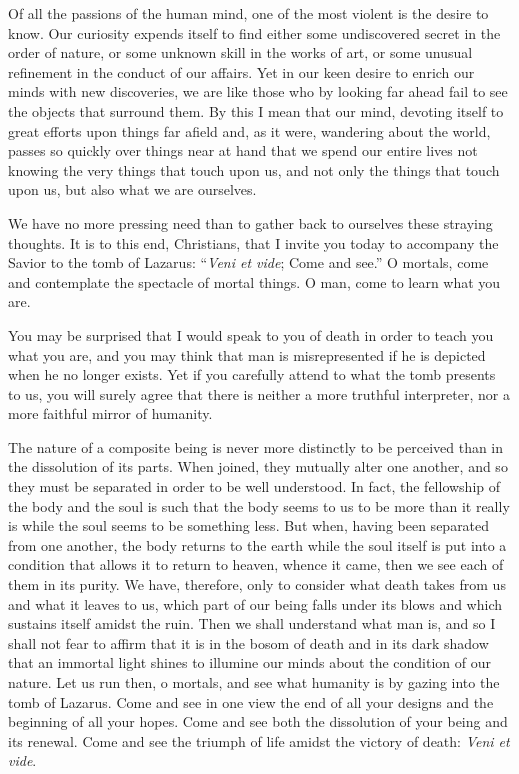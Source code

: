 \documentclass[10pt, twoside]{article}
\begin{document}
Of all the passions of the human mind, one of the most violent is the desire to know. Our curiosity expends itself to find either some undiscovered secret in the order of nature, or some unknown skill in the works of art, or some unusual refinement in the conduct of our affairs. Yet in our keen desire to enrich our minds with new discoveries, we are like those who by looking far ahead fail to see the objects that surround them. By this I mean that our mind, devoting itself to great efforts upon things far afield and, as it were, wandering about the world, passes so quickly over things near at hand that we spend our entire lives not knowing the very things that touch upon us, and not only the things that touch upon us, but also what we are ourselves.

We have no more pressing need than to gather back to ourselves these straying thoughts. It is to this end, Christians, that I invite you today to accompany the Savior to the tomb of Lazarus: ``\textit{Veni et vide}; Come and see.'' O mortals, come and contemplate the spectacle of mortal things. O man, come to learn what you are.

You may be surprised that I would speak to you of death in order to teach you what you are, and you may think that man is misrepresented if he is depicted when he no longer exists. Yet if you carefully attend to what the tomb presents to us, you will surely agree that there is neither a more truthful interpreter, nor a more faithful mirror of humanity.

The nature of a composite being is never more distinctly to be perceived than in the dissolution of its parts. When joined, they mutually alter one another, and so they must be separated in order to be well understood. In fact, the fellowship of the body and the soul is such that the body seems to us to be more than it really is while the soul seems to be something less. But when, having been separated from one another, the body returns to the earth while the soul itself is put into a condition that allows it to return to heaven, whence it came, then we see each of them in its purity. We have, therefore, only to consider what death takes from us and what it leaves to us, which part of our being falls under its blows and which sustains itself amidst the ruin. Then we shall understand what man is, and so I shall not fear to affirm that it is in the bosom of death and in its dark shadow that an immortal light shines to illumine our minds about the condition of our nature. Let us run then, o mortals, and see what humanity is by gazing into the tomb of Lazarus. Come and see in one view the end of all your designs and the beginning of all your hopes. Come and see both the dissolution of your being and its renewal. Come and see the triumph of life amidst the victory of death: \textit{Veni et vide}.
\end{document}
